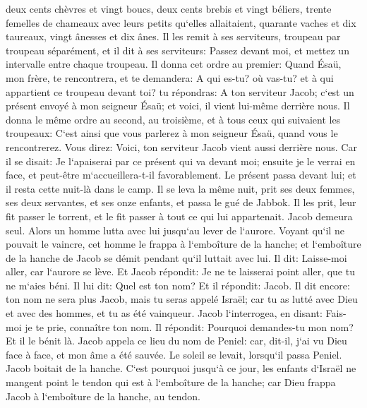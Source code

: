 \verse deux cents chèvres et vingt boucs, deux cents brebis et vingt béliers, 
\verse trente femelles de chameaux avec leurs petits qu`elles allaitaient, quarante vaches et dix taureaux, vingt ânesses et dix ânes. 
\verse Il les remit à ses serviteurs, troupeau par troupeau séparément, et il dit à ses serviteurs: Passez devant moi, et mettez un intervalle entre chaque troupeau. 
\verse Il donna cet ordre au premier: Quand Ésaü, mon frère, te rencontrera, et te demandera: A qui es-tu? où vas-tu? et à qui appartient ce troupeau devant toi? 
\verse tu répondras: A ton serviteur Jacob; c`est un présent envoyé à mon seigneur Ésaü; et voici, il vient lui-même derrière nous. 
\verse Il donna le même ordre au second, au troisième, et à tous ceux qui suivaient les troupeaux: C`est ainsi que vous parlerez à mon seigneur Ésaü, quand vous le rencontrerez. 
\verse Vous direz: Voici, ton serviteur Jacob vient aussi derrière nous. Car il se disait: Je l`apaiserai par ce présent qui va devant moi; ensuite je le verrai en face, et peut-être m`accueillera-t-il favorablement. 
\verse Le présent passa devant lui; et il resta cette nuit-là dans le camp. 
\verse Il se leva la même nuit, prit ses deux femmes, ses deux servantes, et ses onze enfants, et passa le gué de Jabbok. 
\verse Il les prit, leur fit passer le torrent, et le fit passer à tout ce qui lui appartenait. 
\verse Jacob demeura seul. Alors un homme lutta avec lui jusqu`au lever de l`aurore. 
\verse Voyant qu`il ne pouvait le vaincre, cet homme le frappa à l`emboîture de la hanche; et l`emboîture de la hanche de Jacob se démit pendant qu`il luttait avec lui. 
\verse Il dit: Laisse-moi aller, car l`aurore se lève. Et Jacob répondit: Je ne te laisserai point aller, que tu ne m`aies béni. 
\verse Il lui dit: Quel est ton nom? Et il répondit: Jacob. 
\verse Il dit encore: ton nom ne sera plus Jacob, mais tu seras appelé Israël; car tu as lutté avec Dieu et avec des hommes, et tu as été vainqueur. 
\verse Jacob l`interrogea, en disant: Fais-moi je te prie, connaître ton nom. Il répondit: Pourquoi demandes-tu mon nom? Et il le bénit là. 
\verse Jacob appela ce lieu du nom de Peniel: car, dit-il, j`ai vu Dieu face à face, et mon âme a été sauvée. 
\verse Le soleil se levait, lorsqu`il passa Peniel. Jacob boitait de la hanche. 
\verse C`est pourquoi jusqu`à ce jour, les enfants d`Israël ne mangent point le tendon qui est à l`emboîture de la hanche; car Dieu frappa Jacob à l`emboîture de la hanche, au tendon. 


